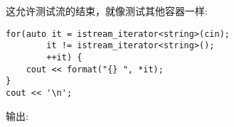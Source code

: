 这允许测试流的结束，就像测试其他容器一样:

\begin{lstlisting}[style=styleCXX]
for(auto it = istream_iterator<string>(cin);
		it != istream_iterator<string>();
		++it) {
	cout << format("{} ", *it);
}
cout << '\n';
\end{lstlisting}

输出:


